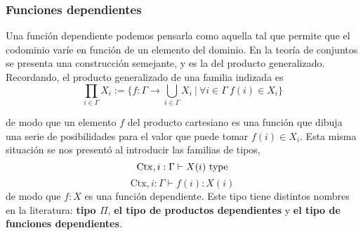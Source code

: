 \documentclass{article}
\begin{document}
    \subsubsection{Funciones dependientes}
        Una función dependiente podemos pensarla como aquella tal que permite
        que el codominio varíe en función de un elemento del dominio. En
        la teoría de conjuntos se presenta una construcción semejante, y es la
        del producto generalizado. Recordando, el producto generalizado de una
        familia indizada es
        $$
            \prod_{i \in \Gamma} X_i := 
            \{f : \Gamma \rightarrow \bigcup\limits_{i \in \Gamma} X_i\ 
                \vert\ \forall i \in \Gamma\ f(i) \in X_i\}
        $$

        de modo que un elemento $f$ del producto cartesiano es una función que
        dibuja una serie de posibilidades para el valor que puede tomar 
        $f(i) \in X_i$. Esta misma situación se nos presentó al introducir las
        familias de tipos,
        $$
            \mathrm{Ctx}, i : \Gamma \vdash X(i)\ \mathrm{type}
        $$
        $$
            \mathrm{Ctx}, i : \Gamma \vdash f(i) : X(i)
        $$
        de modo que $f : X$ es una función dependiente. Este tipo tiene 
        distintos nombres en la literatura: \textbf{tipo $\Pi$}, 
        \textbf{el tipo de productos dependientes} y 
        \textbf{el tipo de funciones dependientes}.
\end{document}
